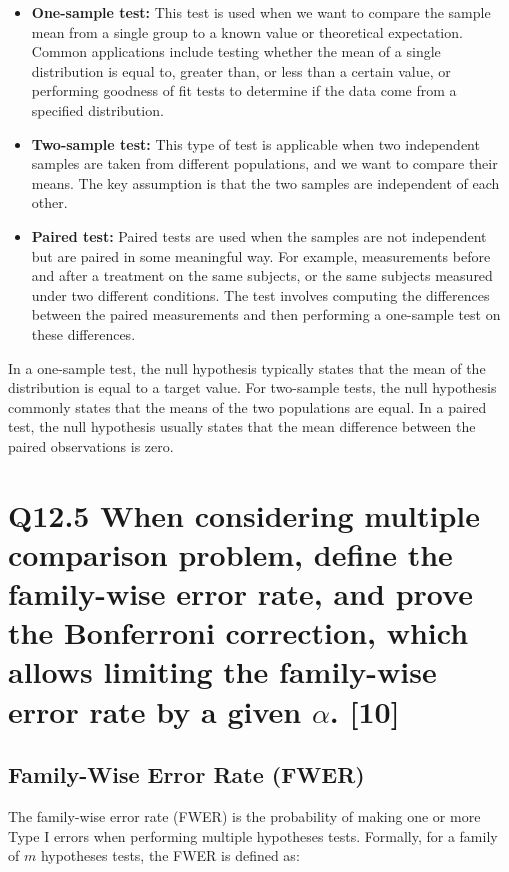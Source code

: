 \documentclass[11pt]{article}
\begin{document}
\begin{itemize}
    \item \textbf{One-sample test:} This test is used when we want to compare the sample mean from a single group to a known value or theoretical expectation. Common applications include testing whether the mean of a single distribution is equal to, greater than, or less than a certain value, or performing goodness of fit tests to determine if the data come from a specified distribution.

    \item \textbf{Two-sample test:} This type of test is applicable when two independent samples are taken from different populations, and we want to compare their means. The key assumption is that the two samples are independent of each other.

    \item \textbf{Paired test:} Paired tests are used when the samples are not independent but are paired in some meaningful way. For example, measurements before and after a treatment on the same subjects, or the same subjects measured under two different conditions. The test involves computing the differences between the paired measurements and then performing a one-sample test on these differences.
\end{itemize}

In a one-sample test, the null hypothesis typically states that the mean of the distribution is equal to a target value. For two-sample tests, the null hypothesis commonly states that the means of the two populations are equal. In a paired test, the null hypothesis usually states that the mean difference between the paired observations is zero.

\section{Q12.5 When considering multiple comparison problem, define the family-wise error rate, and prove the Bonferroni correction, which allows limiting the family-wise error rate by a given $\alpha$. [10]}

\subsection*{Family-Wise Error Rate (FWER)}

The family-wise error rate (FWER) is the probability of making one or more Type I errors when performing multiple hypotheses tests. Formally, for a family of $m$ hypotheses tests, the FWER is defined as:
\end{document}
